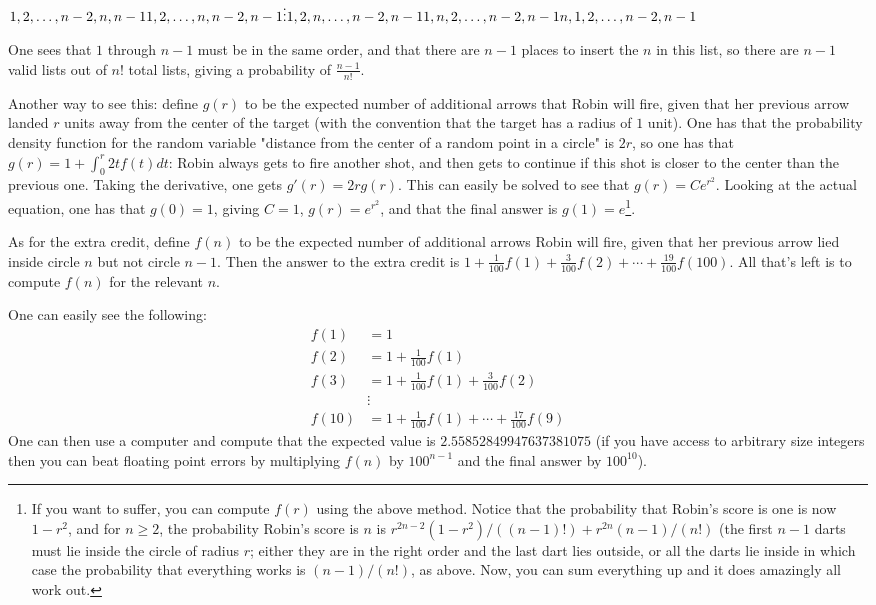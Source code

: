 \documentclass[11pt]{article}
\theoremstyle{definition}
\begin{document}
$1, 2, \ldots, n-2, n, n-1 \\
1, 2, \ldots, n, n-2, n-1 \\
\vdots \\
1, 2, n, \ldots, n-2, n-1 \\
1, n, 2, \ldots, n-2, n-1 \\
n, 1, 2, \ldots, n-2, n-1$

One sees that $1$ through $n-1$ must be in the same order, and that there are $n-1$ places to insert the $n$ in this list, so there are $n-1$ valid lists out of $n!$ total lists, giving a probability of $\displaystyle{\frac{n-1}{n!}}$.

Another way to see this: define $g(r)$ to be the expected number of additional arrows that Robin will fire, given that her previous arrow landed $r$ units away from the center of the target (with the convention that the target has a radius of $1$ unit).  One has that the probability density function for the random variable "distance from the center of a random point in a circle" is $2r$, so one has that $g(r) = 1 + \int_0^r 2tf(t)dt$: Robin always gets to fire another shot, and then gets to continue if this shot is closer to the center than the previous one.  Taking the derivative, one gets $g'(r) = 2rg(r)$.  This can easily be solved to see that $g(r) = Ce^{r^2}$.  Looking at the actual equation, one has that $g(0) = 1$, giving $C = 1$, $g(r) = e^{r^2}$, and that the final answer is $g(1) = e$\footnote{If you want to suffer, you can compute $f(r)$ using the above method.  Notice that the probability that Robin's score is one is now $1-r^2$, and for $n \geq 2$, the probability Robin's score is $n$ is $r^{2n-2}(1-r^2)/((n-1)!) + r^{2n}(n-1)/(n!)$ (the first $n-1$ darts must lie inside the circle of radius $r$; either they are in the right order and the last dart lies outside, or all the darts lie inside in which case the probability that everything works is $(n-1)/(n!)$, as above.  Now, you can sum everything up and it does amazingly all work out.}.

As for the extra credit, define $f(n)$ to be the expected number of additional arrows Robin will fire, given that her previous arrow lied inside circle $n$ but not circle $n-1$.  Then the answer to the extra credit is $1 + \displaystyle{\frac{1}{100} f(1) + \frac{3}{100} f(2) + \cdots + \frac{19}{100}f(100)}$.  All that's left is to compute $f(n)$ for the relevant $n$.

One can easily see the following:
\begin{align*}
f(1) & = 1 \\
f(2) & = 1 + \frac{1}{100}f(1) \\
f(3) & = 1 + \frac{1}{100}f(1) + \frac{3}{100}f(2) \\
& \vdots \\
f(10) & = 1 + \frac{1}{100}f(1) + \cdots + \frac{17}{100} f(9)
\end{align*}
One can then use a computer and compute that the expected value is $2.55852849947637381075$ (if you have access to arbitrary size integers then you can beat floating point errors by multiplying $f(n)$ by $100^{n-1}$ and the final answer by $100^{10}$).
\end{document}
